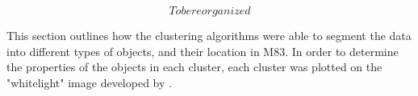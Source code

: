 
\[ To be reorganized \]

This section outlines how the clustering algorithms were able to segment the data into different types of objects, and their location in M83.
In order to determine the properties of the objects in each cluster, each cluster was plotted on the "whitelight" image developed by \citet{chandar10}. %




